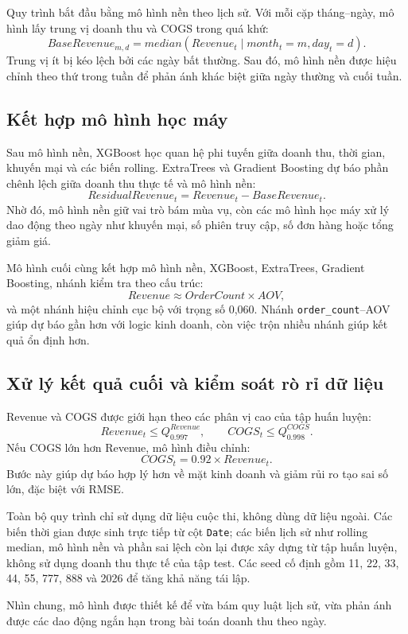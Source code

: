 \documentclass{article}
\begin{document}
Quy trình bắt đầu bằng mô hình nền theo lịch sử. Với mỗi cặp tháng--ngày, mô hình lấy trung vị doanh
thu và COGS trong quá khứ:
\[
BaseRevenue_{m,d}=median(Revenue_t \mid month_t=m, day_t=d).
\]
Trung vị ít bị kéo lệch bởi các ngày bất thường. Sau đó, mô hình nền được hiệu chỉnh theo thứ trong
tuần để phản ánh khác biệt giữa ngày thường và cuối tuần.

\subsection{Kết hợp mô hình học máy}

Sau mô hình nền, XGBoost học quan hệ phi tuyến giữa doanh thu, thời gian, khuyến mại và các biến
rolling. ExtraTrees và Gradient Boosting dự báo phần chênh lệch giữa doanh thu thực tế và mô hình
nền:
\[
ResidualRevenue_t=Revenue_t-BaseRevenue_t.
\]
Nhờ đó, mô hình nền giữ vai trò bám mùa vụ, còn các mô hình học máy xử lý dao động theo ngày như
khuyến mại, số phiên truy cập, số đơn hàng hoặc tổng giảm giá.

Mô hình cuối cùng kết hợp mô hình nền, XGBoost, ExtraTrees, Gradient Boosting, nhánh kiểm tra theo
cấu trúc:
\[
Revenue \approx OrderCount \times AOV,
\]
và một nhánh hiệu chỉnh cục bộ với trọng số 0,060. Nhánh \texttt{order\_count}--AOV giúp dự báo gần
hơn với logic kinh doanh, còn việc trộn nhiều nhánh giúp kết quả ổn định hơn.

\subsection{Xử lý kết quả cuối và kiểm soát rò rỉ dữ liệu}

Revenue và COGS được giới hạn theo các phân vị cao của tập huấn luyện:
\[
Revenue_t \leq Q_{0.997}^{Revenue}, \qquad COGS_t \leq Q_{0.998}^{COGS}.
\]
Nếu COGS lớn hơn Revenue, mô hình điều chỉnh:
\[
COGS_t=0.92\times Revenue_t.
\]
Bước này giúp dự báo hợp lý hơn về mặt kinh doanh và giảm rủi ro tạo sai số lớn, đặc biệt với RMSE.

Toàn bộ quy trình chỉ sử dụng dữ liệu cuộc thi, không dùng dữ liệu ngoài. Các biến thời gian được
sinh trực tiếp từ cột \texttt{Date}; các biến lịch sử như rolling median, mô hình nền và phần sai
lệch còn lại được xây dựng từ tập huấn luyện, không sử dụng doanh thu thực tế của tập test. Các seed
cố định gồm 11, 22, 33, 44, 55, 777, 888 và 2026 để tăng khả năng tái lập.

Nhìn chung, mô hình được thiết kế để vừa bám quy luật lịch sử, vừa phản ánh được các dao động ngắn
hạn trong bài toán doanh thu theo ngày.
\end{document}
